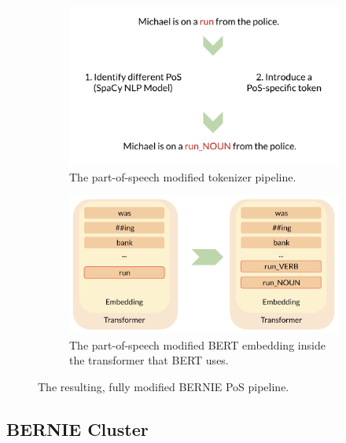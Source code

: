 \documentclass[a4paper,12pt,oneside,openright]{report}
\begin{document}
\begin{figure}
\begin{subfigure}{.5\textwidth}
  \centering
  \includegraphics[width=\linewidth]{./assets/experiments/pipeline_tokenizer_BERnie_POS_sentence.png}
  \caption{The part-of-speech modified tokenizer pipeline.}
  \label{fig:sfig1}
\end{subfigure}%
\hfill
\begin{subfigure}{.55\textwidth}
  \centering
  \includegraphics[width=\linewidth]{./assets/experiments/pipeline_model_BERnie_POS.png}
  \caption{The part-of-speech modified BERT embedding inside the transformer that BERT uses.}
  \label{fig:sfig2}
\end{subfigure}
\caption{The resulting, fully modified BERNIE PoS pipeline.}
\label{fig:BERNIE_POS_full_pipeline}
\end{figure}

\subsection{BERNIE Cluster}\label{experiment_bernie_meaning}
\end{document}
